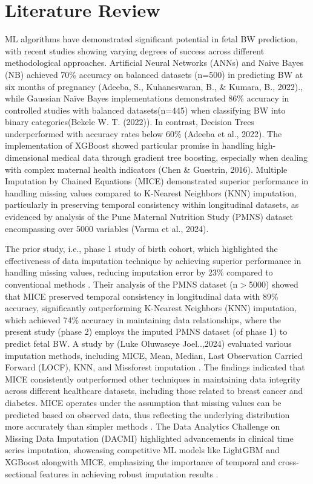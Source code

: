 \documentclass[12pt]{article}
\begin{document}
\section{Literature Review}
ML algorithms have demonstrated significant potential in fetal BW prediction, with recent studies showing varying degrees of success across different methodological approaches. Artificial Neural Networks (ANNs) and Naive Bayes (NB) achieved 70\% accuracy on balanced datasets (n=500) in predicting BW at six months of pregnancy (Adeeba, S., Kuhaneswaran, B., \& Kumara, B., 2022).\cite{5A}, while Gaussian Naïve Bayes implementations demonstrated 86\% accuracy in controlled studies with balanced datasets(n=445) when classifying BW into binary categories(Bekele W. T. (2022))\cite{6A}. In contrast, Decision Trees underperformed with accuracy rates below 60\% (Adeeba et al., 2022)\cite{5A}. The implementation of XGBoost showed particular promise in handling high-dimensional medical data through gradient tree boosting, especially when dealing with complex maternal health indicators (Chen \& Guestrin, 2016)\cite{7A}. Multiple Imputation by Chained Equations (MICE) demonstrated superior performance in handling missing values compared to K-Nearest Neighbors (KNN) imputation, particularly in preserving temporal consistency within longitudinal datasets, as evidenced by analysis of the Pune Maternal Nutrition Study (PMNS) dataset encompassing over 5000 variables (Varma et al., 2024)\cite{8A}.
 
The prior study, i.e., phase 1 study of birth cohort, which highlighted the effectiveness of data imputation technique by achieving superior performance in handling missing values, reducing imputation error by 23\% compared to conventional methods \cite{8A}. Their analysis of the PMNS dataset (n$>$5000) showed that MICE preserved temporal consistency in longitudinal data with 89\% accuracy, significantly outperforming K-Nearest Neighbors (KNN) imputation, which achieved 74\% accuracy in maintaining data relationships, where the present study (phase 2) employs the imputed PMNS dataset (of phase 1) to predict fetal BW. A study by (Luke Oluwaseye Joel..,2024) evaluated various imputation methods, including MICE, Mean, Median, Last Observation Carried Forward (LOCF), KNN, and Missforest imputation \cite{9A}. The findings indicated that MICE consistently outperformed other techniques in maintaining data integrity across different healthcare datasets, including those related to breast cancer and diabetes.  MICE operates under the assumption that missing values can be predicted based on observed data, thus reflecting the underlying distribution more accurately than simpler methods \cite{9A}. The Data Analytics Challenge on Missing Data Imputation (DACMI) highlighted advancements in clinical time series imputation, showcasing competitive ML models like LightGBM and XGBoost alongwith MICE, emphasizing the importance of temporal and cross-sectional features in achieving robust imputation results \cite{10A}.
\end{document}
